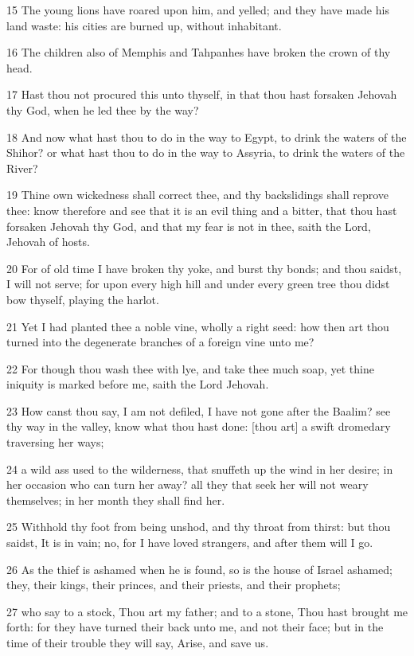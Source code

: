 \par 15 The young lions have roared upon him, and yelled; and they have made his land waste: his cities are burned up, without inhabitant.
\par 16 The children also of Memphis and Tahpanhes have broken the crown of thy head.
\par 17 Hast thou not procured this unto thyself, in that thou hast forsaken Jehovah thy God, when he led thee by the way?
\par 18 And now what hast thou to do in the way to Egypt, to drink the waters of the Shihor? or what hast thou to do in the way to Assyria, to drink the waters of the River?
\par 19 Thine own wickedness shall correct thee, and thy backslidings shall reprove thee: know therefore and see that it is an evil thing and a bitter, that thou hast forsaken Jehovah thy God, and that my fear is not in thee, saith the Lord, Jehovah of hosts.
\par 20 For of old time I have broken thy yoke, and burst thy bonds; and thou saidst, I will not serve; for upon every high hill and under every green tree thou didst bow thyself, playing the harlot.
\par 21 Yet I had planted thee a noble vine, wholly a right seed: how then art thou turned into the degenerate branches of a foreign vine unto me?
\par 22 For though thou wash thee with lye, and take thee much soap, yet thine iniquity is marked before me, saith the Lord Jehovah.
\par 23 How canst thou say, I am not defiled, I have not gone after the Baalim? see thy way in the valley, know what thou hast done: [thou art] a swift dromedary traversing her ways;
\par 24 a wild ass used to the wilderness, that snuffeth up the wind in her desire; in her occasion who can turn her away? all they that seek her will not weary themselves; in her month they shall find her.
\par 25 Withhold thy foot from being unshod, and thy throat from thirst: but thou saidst, It is in vain; no, for I have loved strangers, and after them will I go.
\par 26 As the thief is ashamed when he is found, so is the house of Israel ashamed; they, their kings, their princes, and their priests, and their prophets;
\par 27 who say to a stock, Thou art my father; and to a stone, Thou hast brought me forth: for they have turned their back unto me, and not their face; but in the time of their trouble they will say, Arise, and save us.

